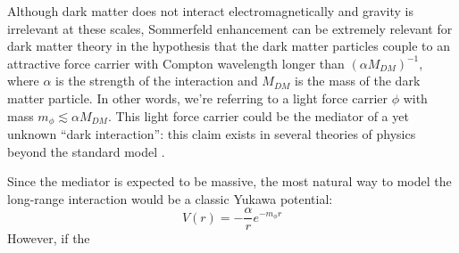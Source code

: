 Although dark matter does not interact electromagnetically and gravity is irrelevant at these scales, Sommerfeld enhancement can be extremely relevant for dark matter theory in the hypothesis that the dark matter particles couple to an attractive force carrier with Compton wavelength longer than \((\alpha M_{DM})^{-1} \), where \(\alpha\) is the strength of the interaction and \(M_{DM} \) is the mass of the dark matter particle. In other words, we're referring to a light force carrier \(\phi \) with mass \(m_{\phi } \lesssim \alpha M_{DM} \). This light force carrier could be the mediator of a yet unknown ``dark interaction'': this claim exists in several theories of physics beyond the standard model \cite{Arkani_2009}.

Since the mediator is expected to be massive, the most natural way to model the long-range interaction would be a classic Yukawa potential:
\begin{equation}
	V(r) = -\frac{\alpha }{r} e^{-m_{\phi } r}
\end{equation}
However, if the 